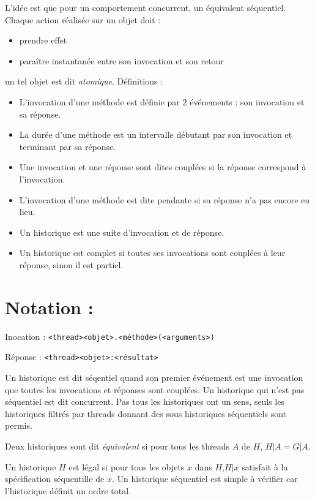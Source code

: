 \documentclass[11pt,a4paper]{report}
\begin{document}
L'idée est que pour un comportement concurrent, un équivalent séquentiel. Chaque action réalisée sur un objet doit :
\begin{itemize}
    \item prendre effet
    \item paraître instantanée entre son invocation et son retour
\end{itemize}

un tel objet est dit \textit{atomique}. Définitions :
\begin{itemize}
    \item L'invocation d'une méthode est définie par $2$ événements : son invocation et sa réponse.
    \item La durée d'une méthode est un intervalle débutant par son invocation et terminant par sa réponse.
    \item Une invocation et une réponse sont dites couplées si la réponse correspond à l'invocation.
    \item L'invocation d'une méthode est dite pendante si sa réponse n'a pas encore eu lieu.
    \item Un historique est une suite d'invocation et de réponse.
    \item Un historique est complet si toutes ses invocations sont couplées à leur réponse, sinon il est partiel.
\end{itemize}

\section*{Notation :}

Inocation : \verb|<thread><objet>.<méthode>(<arguments>)|

Réponse : \verb|<thread><objet>:<résultat>|

Un historique est dit séqentiel quand son premier événement est une invocation que toutes les invocations et réponses sont couplées. Un historique qui n'est pas séquentiel est dit concurrent. Pas tous les historiques ont un sens, seuls les historiques filtrés par threads donnant des sous historiques séquentiels sont permis.

Deux historiques sont dit \textit{équivalent} si pour tous les threads $A$ de $H$, $H|A=G|A$.

Un historique $H$ est légal si pour tous les objets $x$ dans $H$,$H|x$ satisfait à la spécification séquentille de $x$. Un historique séquentiel est simple à vérifier car l'historique définit un ordre total.
\end{document}
